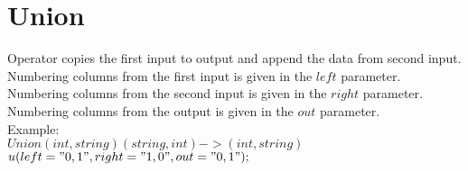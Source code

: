 \documentclass{article}
\begin{document}
\section{Union}
Operator copies the first input to output and append the data from second input.\\
Numbering columns from the first input is given in the $left$ parameter.\\
Numbering columns from the second input is given in the $right$ parameter.\\
Numbering columns from the output is given in the $out$ parameter.\\
Example:\\
$Union(int,string)(string,int)->(int,string)$\\
$u(left="0,1",right="1,0",out="0,1");$\\
\end{document}
